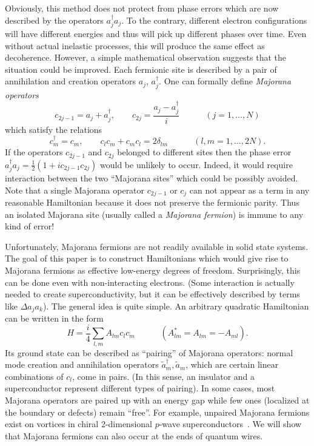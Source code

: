 Obviously, this method does not protect from phase errors which are now
described by the operators $a_j^\dagger a_j$. To the contrary, different
electron configurations will have different energies and thus will pick up
different phases over time. Even without actual inelastic processes, this will
produce the same effect as decoherence. However, a simple mathematical
observation suggests that the situation could be improved. Each fermionic site
is described by a pair of annihilation and creation operators $a_j$,
$a_j^\dagger$. One can formally define {\em Majorana operators}
\begin{equation}\label{Majorana0}
c_{2j-1}=a_j+a_j^\dagger, \qquad c_{2j}=\frac{a_j-a_j^\dagger}{i}
\qquad\quad (j=1,\ldots,N)
\end{equation}
which satisfy the relations
\begin{equation}\label{Majorana_relations}
c_m^\dagger=c_m, \qquad c_lc_m+c_mc_l=2\delta_{lm}
\qquad\quad (l,m=1,\ldots,2N).
\end{equation}
If the operators $c_{2j-1}$ and $c_{2j}$ belonged to
different sites then the phase error $a_j^\dagger a_j=
\frac{1}{2}(1+ic_{2j-1}c_{2j})$ would be unlikely to occur. Indeed, it would
require interaction between the two ``Majorana sites'' which could be possibly
avoided. Note that a single Majorana operator $c_{2j-1}$ or $c_{j}$ can not
appear as a term in any reasonable Hamiltonian because it does not preserve
the fermionic parity. Thus an isolated Majorana site (usually called a {\em
Majorana fermion}) is immune to any kind of error!

Unfortunately, Majorana fermions are not readily available in solid state
systems. The goal of this paper is to construct Hamiltonians which would give
rise to Majorana fermions as effective low-energy degrees of freedom.
Surprisingly, this can be done even with non-interacting electrons. (Some
interaction is actually needed to create superconductivity, but it can be
effectively described by terms like $\Delta a_ja_{k}$). The general idea is
quite simple. An arbitrary quadratic Hamiltonian can be written in the form
\begin{equation}\label{quadratic_Hamiltonian}
H= \frac{i}{4}\sum_{l,m} A_{lm}c_lc_m \qquad\quad
(A_{lm}^*=A_{lm}=-A_{ml}).
\end{equation}
Its ground state can be described as ``pairing'' of Majorana operators: normal
mode creation and annihilation operators $\tilde a_m^\dagger,\tilde a_m$,
which are certain linear combinations of $c_l$, come in pairs. (In this
sense, an insulator and a superconductor represent different types of
pairing). In some cases, most Majorana operators are paired up with an energy
gap while few ones (localized at the boundary or defects) remain ``free''. For
example, unpaired Majorana fermions exist on vortices in chiral 2-dimensional
$p$-wave superconductors~\cite{ReadGreen,Ivanov}. We will show that Majorana
fermions can also occur at the ends of quantum wires.


